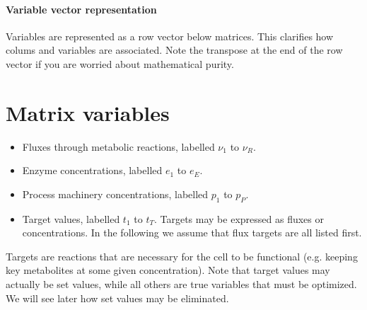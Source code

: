 \documentclass[12pt]{scrartcl}
\theoremstyle{definition}
\theoremstyle{remark}
\numberwithin{equation}{section}
\begin{document}
\paragraph{Variable vector representation}
Variables are represented as a row vector below matrices.
This clarifies how colums and variables are associated.
Note the transpose at the end of the row vector if you are worried about
mathematical purity.

\section{Matrix variables}

\begin{itemize}
  \item Fluxes through metabolic reactions, labelled $\nu_1$ to $\nu_R$.
  \item Enzyme concentrations, labelled $e_1$ to $e_E$.
  \item Process machinery concentrations, labelled $p_1$ to $p_P$.
  \item Target values, labelled $t_1$ to $t_T$.
  Targets may be expressed as fluxes or concentrations.
  In the following we assume that flux targets are all listed first.
\end{itemize}
Targets are reactions that are necessary for the cell to be functional
(e.g. keeping key metabolites at some given concentration).
Note that target values may actually be set values,
while all others are true variables that must be optimized.
We will see later how set values may be eliminated.


\clearpage


\clearpage

\newpage
\appendix

\clearpage



%
%
\end{document}
